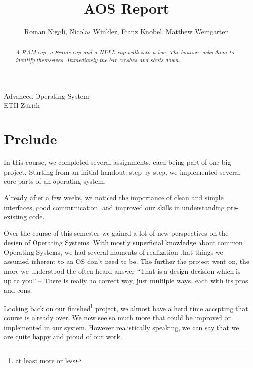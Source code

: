 \documentclass{article}
\begin{document}
\begin{titlepage}
\Huge
\title{\textbf{AOS Report}}
\author{Roman Niggli, Nicolas Winkler, Franz Knobel, Matthew Weingarten}
\maketitle

\vspace{3cm}
\begin{center}
    \Large
    Advanced Operating System\\
    ETH Zürich\\
    \date{}
\end{center}
\end{titlepage}
\newpage

\makeindex
\tableofcontents


\newpage
\begin{abstract}
 \emph{   A RAM cap, a Frame cap and a NULL cap walk into a bar. The bouncer asks them to identify themselves. Immediately the bar crashes and shuts down.}
\end{abstract}
\newpage


\section{Prelude}

In this course, we completed several assignments, each being part of one big project.
Starting from an initial handout, step by step, we implemented several core parts of an operating system.

Already after a few weeks, we noticed the importance of clean and simple interfaces,
good communication, and improved our skills in understanding pre-existing code.

Over the course of this semester we gained a lot of new perspectives on the design of Operating Systems.
With mostly superficial knowledge about common Operating Systems, we had several moments
of realization that things we assumed inherent to an OS don't need to be. The further
the project went on, the more we understood the often-heard answer ``That is a design
decision which is up to you'' -- There is really no correct way, just multiple ways, each
with its pros and cons.

Looking back on our finished\footnote{at least more or less} project, we almost have a 
hard time accepting that course is already over. We now see so much more
that could be improved or implemented in our system. However realistically speaking,
we can say that we are quite happy and proud of our work.
\end{document}
